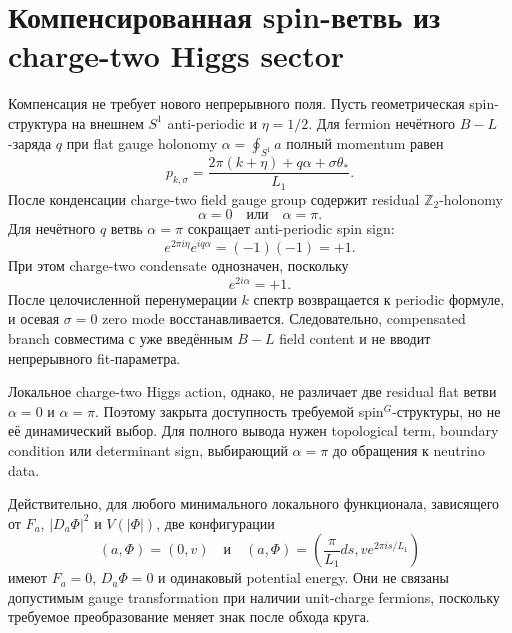 \section{Компенсированная spin-ветвь из charge-two Higgs sector}

Компенсация не требует нового непрерывного поля. Пусть геометрическая
spin-структура на внешнем \(S^1\) anti-periodic и \(\eta=1/2\). Для
fermion нечётного \(B-L\)-заряда \(q\) при flat gauge holonomy
\(\alpha=\oint_{S^1}a\) полный momentum равен
\begin{equation}
 p_{k,\sigma}
 =\frac{2\pi(k+\eta)+q\alpha+\sigma\theta_*}{L_1}.
\end{equation}
После конденсации charge-two field gauge group содержит residual
\(\mathbb Z_2\)-holonomy
\begin{equation}
 \alpha=0\quad\text{или}\quad\alpha=\pi.
\end{equation}
Для нечётного \(q\) ветвь \(\alpha=\pi\) сокращает anti-periodic spin sign:
\begin{equation}
 e^{2\pi i\eta}e^{iq\alpha}=(-1)(-1)=+1.
\end{equation}
При этом charge-two condensate однозначен, поскольку
\begin{equation}
 e^{2i\alpha}=+1.
\end{equation}
После целочисленной перенумерации \(k\) спектр возвращается к periodic
формуле, и осевая \(\sigma=0\) zero mode восстанавливается. Следовательно,
compensated branch совместима с уже введённым \(B-L\) field content и не
вводит непрерывного fit-параметра.

Локальное charge-two Higgs action, однако, не различает две residual flat
ветви \(\alpha=0\) и \(\alpha=\pi\). Поэтому закрыта доступность требуемой
spin\(^{G}\)-структуры, но не её динамический выбор. Для полного вывода нужен
topological term, boundary condition или determinant sign, выбирающий
\(\alpha=\pi\) до обращения к neutrino data.

Действительно, для любого минимального локального функционала, зависящего от
\(F_a\), \(|D_a\Phi|^2\) и \(V(|\Phi|)\), две конфигурации
\begin{equation}
 (a,\Phi)=(0,v)
 \quad\text{и}\quad
 (a,\Phi)=\left(\frac{\pi}{L_1}ds,
 ve^{2\pi is/L_1}\right)
\end{equation}
имеют \(F_a=0\), \(D_a\Phi=0\) и одинаковый potential energy. Они не
связаны допустимым gauge transformation при наличии unit-charge fermions,
поскольку требуемое преобразование меняет знак после обхода круга.

